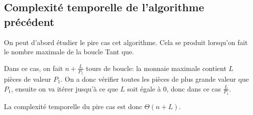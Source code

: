 \documentclass[10.9pt]{article} %
\begin{document}
\begin{algorithm}
\end{algorithm}

\subsection{Complexité temporelle de l'algorithme précédent}

On peut d'abord étudier le pire cas cet algorithme. Cela se produit lorsqu'on fait le 
nombre maximale de la boucle Tant que.

Dans ce cas, on fait $n + \frac{L}{P_1}$ tours de boucle: la monnaie maximale contient $L$ pièces
de valeur $P_1$. On a donc vérifier toutes les pièces de plus grande valeur que $P_1$, ensuite
on va itérer jusqu'à ce que $L$ soit égale à 0, donc dans ce cas $\frac{L}{P_1}$. 

La complexité temporelle du pire cas est donc $\Theta(n + L)$.
\end{document}
